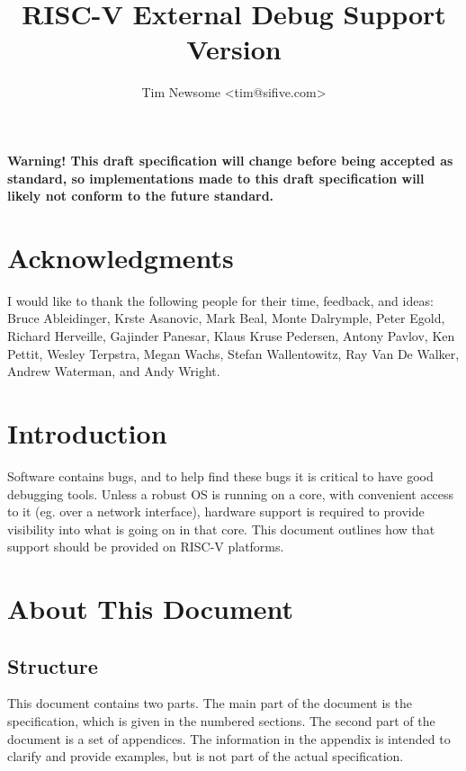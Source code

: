 \documentclass{article}
\title{RISC-V External Debug Support\\
Version \versionnum\shortdate}
\author{Tim Newsome \textless tim@sifive.com\textgreater}
\date{\longdate}
\begin{document}
\maketitle

{\bf Warning! This draft specification will change before being accepted as
standard, so implementations made to this draft specification will likely not
conform to the future standard.}

\tableofcontents
\listoffigures
\listoftables

\newpage

\section*{Acknowledgments}

I would like to thank the following people for their time, feedback, and ideas:
Bruce Ableidinger,
Krste Asanovic,
Mark Beal,
Monte Dalrymple,
Peter Egold,
Richard Herveille,
Gajinder Panesar,
Klaus Kruse Pedersen,
Antony Pavlov,
Ken Pettit,
Wesley Terpstra,
Megan Wachs,
Stefan Wallentowitz,
Ray Van De Walker,
Andrew Waterman,
and Andy Wright.

\section{Introduction}

Software contains bugs, and to help find these bugs it is critical to have good
debugging tools. Unless a robust OS is running on a core, with convenient
access to it (eg. over a network interface), hardware support is required to
provide visibility into what is going on in that core.  This document outlines
how that support should be provided on RISC-V platforms.

\section{About This Document}

\subsection{Structure}

This document contains two parts. The main part of the document is the
specification, which is given in the numbered sections. The second part
of the document is a set of  appendices. The information
in the appendix is intended to clarify and provide examples, but is
not part of the actual specification.
\end{document}
